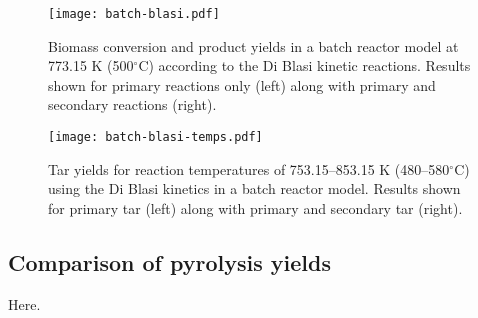 \begin{figure}[H]
    \centering
    \texttt{[image: batch-blasi.pdf]}
    \caption{Biomass conversion and product yields in a batch reactor model at 773.15 K (500$^\circ$C) according to the Di Blasi kinetic reactions. Results shown for primary reactions only (left) along with primary and secondary reactions (right).}
    \label{fig:batch-blasi}
\end{figure}

\begin{figure}[H]
    \centering
    \texttt{[image: batch-blasi-temps.pdf]}
    \caption{Tar yields for reaction temperatures of 753.15--853.15 K (480--580$^\circ$C) using the Di Blasi kinetics in a batch reactor model. Results shown for primary tar (left) along with primary and secondary tar (right).}
    \label{fig:batch-blasi-temps}
\end{figure}

\subsection{Comparison of pyrolysis yields}

Here.
